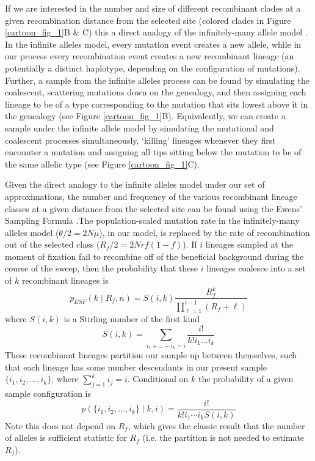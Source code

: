 \documentclass[a4paper,10pt]{article}
\begin{document}
If we are interested in the number and size of different recombinant clades at a given recombination distance from the selected site (colored clades in Figure \ref{cartoon_fig_1}B \& C)  this a direct analogy of the infinitely-many allele model \citep{}. In the infinite alleles model, every mutation event creates a new allele, while in our process every recombination event creates a new recombinant lineage (an potentially a distinct haplotype, depending on the configuration of mutations). Further, a sample from the infinite alleles process can be found by simulating the coalescent, scattering mutations down on the genealogy, and then assigning each lineage to be of a type corresponding to the mutation that sits lowest above it in the genealogy (see Figure \ref{cartoon_fig_1}B). Equivalently, we can create a sample under the infinite allele model by simulating the mutational and coalescent processes simultaneously, `killing' lineages whenever they first encounter a mutation and assigning all tips sitting below the mutation to be of the same allelic type (see Figure \ref{cartoon_fig_1}C). 

Given the direct analogy to the infinite alleles model under our set of approximations, the number and frequency of the various recombinant lineage classes at a given distance from the selected site can be found using the Ewens' Sampling Formula \citep[ESF][]{}.The population-scaled mutation rate in the infinitely-many alleles model ($\theta/2=2N\mu$), in our model, is replaced by the rate of recombination out of the selected class ($R_{f}/2=2Nrf(1-f)$). If $i$ lineages sampled at the moment of fixation fail to recombine off of the beneficial background during the course of the sweep, then the probability that these $i$ lineages coalesce into a set of $k$ recombinant lineages is 
\begin{equation}
	p_{ESF}(k \mid R_f,n)  = S(i,k) \frac{R_f^k}{ \prod_{\ell=1}^{i-1} (R_f +\ell) }  \label{ESF1}
\end{equation}
where $S(i,k)$ is a Stirling number of the first kind
\begin{equation}
	S(i,k) = \sum_{i_1 + \dots + i_k = i} \frac{i!}{k!i_1\dots i_k}
\end{equation}
These recombinant lineages partition our sample up between themselves, such that each lineage has some number descendants in our present sample $\{i_1,i_2,\dots,i_k\}$, where $\sum_{j=1}^k i_j =i$. Conditional on $k$ the probability of a given sample configuration is
\begin{equation}
	p(\{i_1,i_2,\dots,i_k\} \mid k,i) = \frac{i!}{k! i_1\cdots i_k S(i,k)}  \label{ESF2}
\end{equation}
Note this does not depend on $R_f$, which gives the classic result that the number of alleles is sufficient statistic for $R_f$ (i.e. the partition is not needed to estimate $R_f$).
\end{document}
